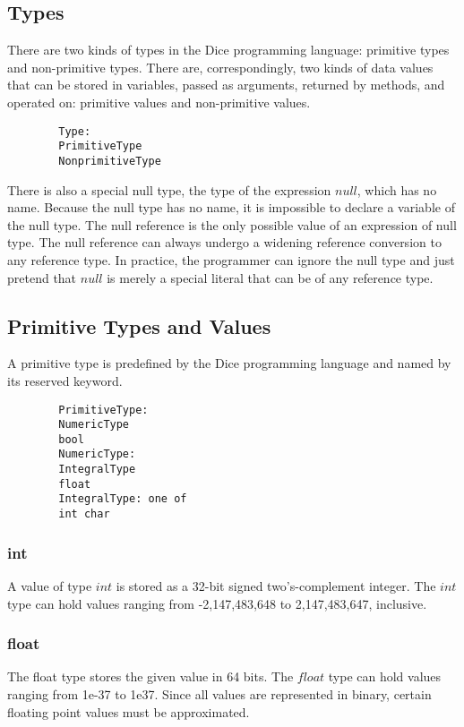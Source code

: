 \begin{homeworkProblem}
	\section{Types}
	There are two kinds of types in the Dice programming language: primitive types and non-primitive types.  There are, correspondingly, two kinds of data values that can be stored in variables, passed as arguments, returned by methods, and operated on: primitive values and non-primitive values.\\
	\begin{verbatim}
		Type:
		PrimitiveType
		NonprimitiveType
	\end{verbatim}
	There is also a special null type, the type of the expression $null$, which has no name. Because the null type has no name, it is impossible to declare a variable of the null type. The null reference is the only possible value of an expression of null type. The null reference can always undergo a widening reference conversion to any reference type. In practice, the programmer can ignore the null type and just pretend that $null$ is merely a special literal that can be of any reference type.\\
	
	\subsection{Primitive Types and Values}
	A primitive type is predefined by the Dice programming language and named by its reserved keyword.
	\begin{verbatim}
		PrimitiveType:
		NumericType
		bool
		NumericType:
		IntegralType
		float
		IntegralType: one of
		int char
	\end{verbatim}
	
	\subsubsection{int}
	A value of type $int$ is stored as a 32-bit signed two's-complement integer. The $int$ type can hold values ranging from -2,147,483,648 to 2,147,483,647, inclusive.
	
	\subsubsection{float}
	
	The float type stores the given value in 64 bits. The $float$ type can hold values ranging from 1e-37 to 1e37. Since all values are represented in binary, certain floating point values must be approximated.
	

\end{homeworkProblem}
